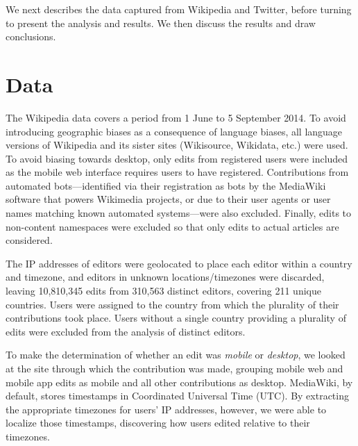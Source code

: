 \documentclass{sigchi}
\begin{document}
We next describes the data captured from Wikipedia and Twitter, before turning to present the analysis and results. We then discuss the results and draw conclusions.

\section{Data}

The Wikipedia data covers a period from 1 June to 5 September 2014. To avoid introducing geographic biases as a consequence of language biases, all language versions of Wikipedia and its sister sites (Wikisource, Wikidata, etc.) were used. To avoid biasing towards desktop, only edits from registered users were included as the mobile web interface requires users to have registered. Contributions from automated bots---identified via their registration as bots by the MediaWiki software that powers Wikimedia projects, or due to their user agents or user names matching known automated systems---were also excluded. Finally, edits to non-content namespaces were excluded so that only edits to actual articles are considered.

The IP addresses of editors were geolocated to place each editor within a country and timezone, and editors in unknown locations\slash{}timezones were discarded, leaving 10,810,345 edits from 310,563 distinct editors, covering 211 unique countries.
Users were assigned to the country from which the plurality of their contributions took place. Users without a single country providing a plurality of edits were excluded from the analysis of distinct editors.


To make the determination of whether an edit was \emph{mobile} or \emph{desktop}, we looked at the site through which the contribution was made, grouping mobile web and mobile app edits as mobile and all other contributions as desktop.
MediaWiki, by default, stores timestamps in Coordinated Universal Time (UTC). By extracting the appropriate timezones for users' IP addresses, however, we were able to localize those timestamps, discovering how users edited relative to their timezones.%
\end{document}

